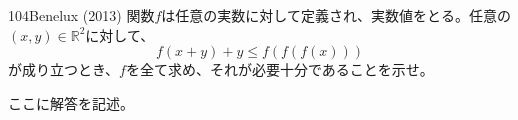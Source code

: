 \begin{thm}{104}{}{Benelux (2013)}
 関数$f$は任意の実数に対して定義され、実数値をとる。任意の$(x,y)\in\mathbb{R}^2$に対して、
 \[ f(x+y)+y \leq f\left(f\left(f(x)\right)\right) \]
 が成り立つとき、$f$を全て求め、それが必要十分であることを示せ。
\end{thm}

ここに解答を記述。
